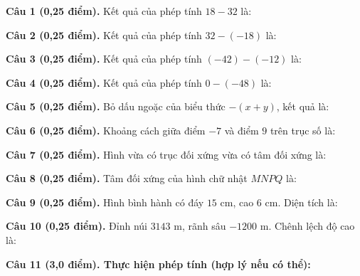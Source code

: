 \documentclass[12pt,a4paper]{article}
\begin{document}
\vspace{1.0mm}
\noindent\textbf{Câu 1 (0,25 điểm).} Kết quả của phép tính $18 - 32$ là: \par\vspace{0.25mm}
\noindent\textbf{Câu 2 (0,25 điểm).} Kết quả của phép tính $32 - (-18)$ là: \par\vspace{0.25mm}
\noindent\textbf{Câu 3 (0,25 điểm).} Kết quả của phép tính $(-42) - (-12)$ là: \par\vspace{0.25mm}
\noindent\textbf{Câu 4 (0,25 điểm).} Kết quả của phép tính $0 - (-48)$ là: \par\vspace{0.25mm}
\noindent\textbf{Câu 5 (0,25 điểm).} Bỏ dấu ngoặc của biểu thức $-(x + y)$, kết quả là: \par\vspace{0.25mm}
\noindent\textbf{Câu 6 (0,25 điểm).} Khoảng cách giữa điểm $-7$ và điểm $9$ trên trục số là: \par\vspace{0.25mm}
\noindent\textbf{Câu 7 (0,25 điểm).} Hình vừa có trục đối xứng vừa có tâm đối xứng là: \par\vspace{0.25mm}
\noindent\textbf{Câu 8 (0,25 điểm).} Tâm đối xứng của hình chữ nhật $MNPQ$ là: \par\vspace{0.25mm}
\noindent\textbf{Câu 9 (0,25 điểm).} Hình bình hành có đáy $15\text{ cm}$, cao $6\text{ cm}$. Diện tích là: \par\vspace{0.25mm}
\noindent\textbf{Câu 10 (0,25 điểm).} Đỉnh núi $3143\text{ m}$, rãnh sâu $-1200\text{ m}$. Chênh lệch độ cao là: \par\vspace{0.25mm}

\vspace{0.3mm}
\noindent\textbf{Câu 11 (3,0 điểm). Thực hiện phép tính (hợp lý nếu có thể):}
\vspace{0.4mm}
\end{document}
